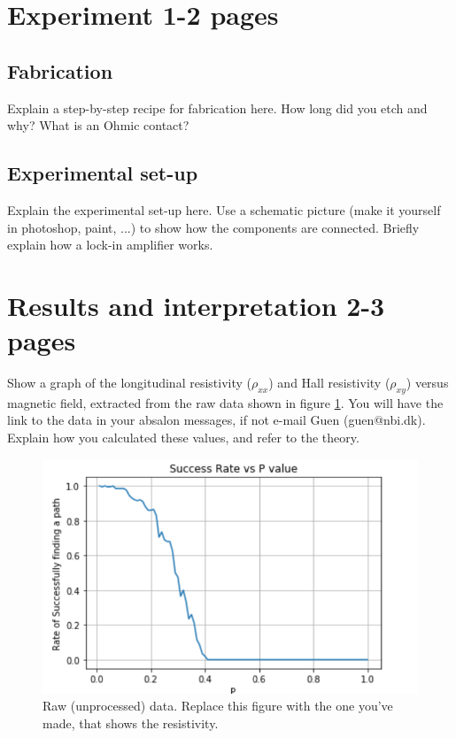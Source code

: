 \documentclass[letter]{article}
\begin{document}
\section{Experiment 1-2 pages}
\subsection{Fabrication}
Explain a step-by-step recipe for fabrication here. How long did you etch and why? What is an Ohmic contact?
\subsection{Experimental set-up}
Explain the experimental set-up here. Use a schematic picture (make it yourself in photoshop, paint, ...) to show how the components are connected. Briefly explain how a lock-in amplifier works.

\section{Results and interpretation 2-3 pages}
Show a graph of the longitudinal resistivity ($\rho_{xx}$) and Hall resistivity ($\rho_{xy}$) versus magnetic field, extracted from the raw data shown in figure \ref{fig:data}. You will have the link to the data in your absalon messages, if not e-mail Guen (guen@nbi.dk). Explain how you calculated these values, and refer to the theory.

\begin{figure}
\centering
\includegraphics[width=1\textwidth]{../pics/question3-1.png}
\caption{\label{fig:data}Raw (unprocessed) data. Replace this figure with the one you've made, that shows the resistivity.}
\end{figure}
\end{document}
